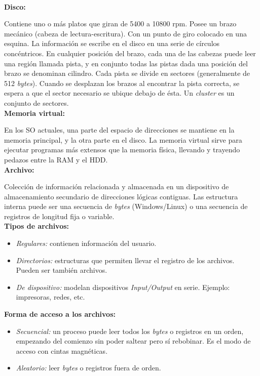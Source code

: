 \documentclass[a4paper,10pt,spanish]{article}
\begin{document}
\dotfill \\

\textbf{Disco:}

Contiene uno o más platos que giran de 5400 a 10800 rpm. Posee un brazo mecánico (cabeza de lectura-escritura). Con un punto de giro colocado en una esquina. La información se escribe en el disco en una serie de círculos concéntricos. En cualquier posición del brazo, cada una de las cabezas puede leer una región llamada pista, y en conjunto todas las pistas dada una posición del brazo se denominan cilindro. Cada pista se divide en sectores (generalmente de 512 \textit{bytes}). Cuando se desplazan los brazos al encontrar la pista correcta, se espera a que el sector necesario se ubique debajo de ésta. Un \textit{cluster} es un conjunto de sectores. \\

\textbf{Memoria virtual:}

En los SO actuales, una parte del espacio de direcciones se mantiene en la memoria principal, y la otra parte en el disco. La memoria virtual sirve para ejecutar programas más extensos que la memoria física, llevando y trayendo pedazos entre la RAM y el HDD. \\

\textbf{Archivo:}

Colección de información relacionada y almacenada en un dispositivo de almacenamiento secundario de direcciones lógicas contiguas. Las estructura interna puede ser una secuencia de \textit{bytes} (Windows/Linux) o una secuencia de registros de longitud fija o variable. \\

\textbf{Tipos de archivos:}

\begin{itemize}
\item \textit{Regulares:} contienen información del usuario.
\item \textit{Directorios:} estructuras que permiten llevar el registro de los archivos. Pueden ser también archivos.
\item \textit{De dispositivo:} modelan dispositivos \textit{Input/Output} en serie. Ejemplo: impresoras, redes, etc.
\end{itemize}

\textbf{Forma de acceso a los archivos:}

\begin{itemize}
\item \textit{Secuencial:} un proceso puede leer todos los \textit{bytes} o registros en un orden, empezando del comienzo sin poder saltear pero sí rebobinar. Es el modo de acceso con cintas magnéticas.

\item \textit{Aleatorio:} leer \textit{bytes} o registros fuera de orden.
\end{itemize}
\end{document}
